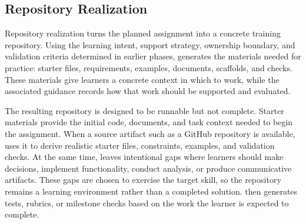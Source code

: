 \subsection{Repository Realization}

Repository realization turns the planned assignment into a concrete training repository.
Using the learning intent, support strategy, ownership boundary, and validation criteria determined in earlier phases, \model generates the materials needed for practice: starter files, requirements, examples, documents, scaffolds, and checks.
These materials give learners a concrete context in which to work, while the associated guidance records how that work should be supported and evaluated.

The resulting repository is designed to be runnable but not complete.
Starter materials provide the initial code, documents, and task context needed to begin the assignment.
When a source artifact such as a GitHub repository is available, \model uses it to derive realistic starter files, constraints, examples, and validation checks.
At the same time, \model leaves intentional gaps where learners should make decisions, implement functionality, conduct analysis, or produce communicative artifacts.
These gaps are chosen to exercise the target skill, so the repository remains a learning environment rather than a completed solution.
\model then generates tests, rubrics, or milestone checks based on the work the learner is expected to complete.
